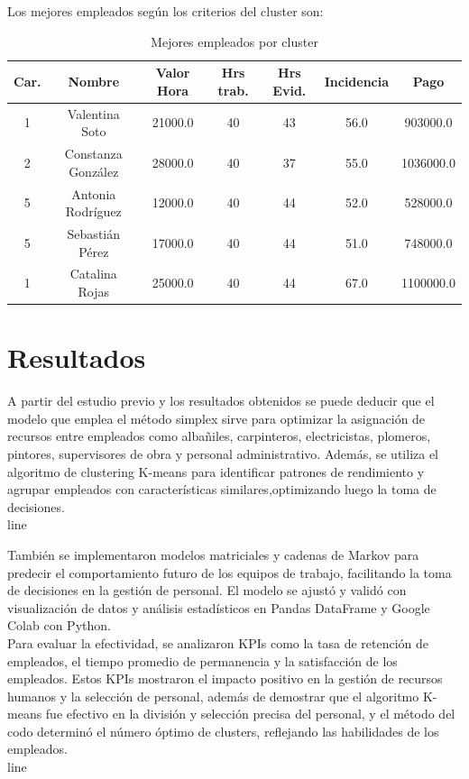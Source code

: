 \documentclass{plantillauft}
\begin{document}
Los mejores empleados según los criterios del cluster son:

\begin{table}[H]
\centering
\caption{Mejores empleados por cluster}
\begin{tabular}{|c|c|c|c|c|c|c|}
\hline
\textbf{Car.} & \textbf{Nombre} & \textbf{Valor Hora} & \textbf{Hrs trab.} & \textbf{Hrs Evid.} & \textbf{Incidencia} & \textbf{Pago} \\ \hline
1 & Valentina Soto & 21000.0 & 40 & 43 & 56.0 & 903000.0 \\ \hline
2 & Constanza González & 28000.0 & 40 & 37 & 55.0 & 1036000.0 \\ \hline
5 & Antonia Rodríguez & 12000.0 & 40 & 44 & 52.0 & 528000.0 \\ \hline
5 & Sebastián Pérez & 17000.0 & 40 & 44 & 51.0 & 748000.0 \\ \hline
1 & Catalina Rojas & 25000.0 & 40 & 44 & 67.0 & 1100000.0 \\ \hline
\end{tabular}
\end{table}


\newpage



\section{Resultados}
A partir del estudio previo y los resultados obtenidos se puede deducir que el modelo que emplea el método simplex sirve para optimizar la asignación de recursos entre empleados como albañiles, carpinteros, electricistas, plomeros, pintores, supervisores de obra y personal administrativo. Además, se utiliza el algoritmo de clustering K-means para identificar patrones de rendimiento y agrupar empleados con características similares,optimizando luego la toma de decisiones.\\line

También se implementaron modelos matriciales y cadenas de Markov para predecir el comportamiento futuro de los equipos de trabajo, facilitando la toma de decisiones en la gestión de personal. El modelo se ajustó y validó con visualización de datos y análisis estadísticos en Pandas DataFrame y Google Colab con Python.\\

Para evaluar la efectividad, se analizaron KPIs como la tasa de retención de empleados, el tiempo promedio de permanencia y la satisfacción de los empleados. Estos KPIs mostraron el impacto positivo en la gestión de recursos humanos y la selección de personal, además de demostrar que el algoritmo K-means fue efectivo en la división y selección precisa del personal, y el método del codo determinó el número óptimo de clusters, reflejando las habilidades de los empleados.\\line
\end{document}
